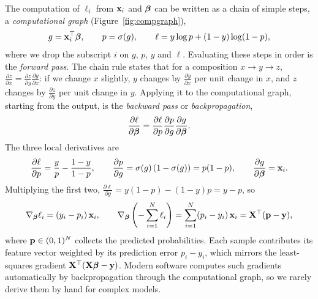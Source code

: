 The computation of $\ell_i$ from $\mathbf{x}_i$ and $\boldsymbol{\beta}$ can be written as a chain of simple steps, a \emph{computational graph} (Figure~\ref{fig:compgraph}),
\begin{equation}
  g = \mathbf{x}_i^\top\boldsymbol{\beta}, \qquad p = \sigma(g), \qquad \ell = y\log p+(1-y)\log(1-p),
\end{equation}
where we drop the subscript $i$ on $g$, $p$, $y$ and $\ell$. Evaluating these steps in order is the \emph{forward pass}. The chain rule states that for a composition $x\to y\to z$, $\frac{\partial z}{\partial x}=\frac{\partial z}{\partial y}\frac{\partial y}{\partial x}$: if we change $x$ slightly, $y$ changes by $\frac{\partial y}{\partial x}$ per unit change in $x$, and $z$ changes by $\frac{\partial z}{\partial y}$ per unit change in $y$. Applying it to the computational graph, starting from the output, is the \emph{backward pass} or \emph{backpropagation},
\begin{equation}
  \frac{\partial\ell}{\partial\boldsymbol{\beta}} = \frac{\partial\ell}{\partial p}\frac{\partial p}{\partial g}\frac{\partial g}{\partial\boldsymbol{\beta}}.
\end{equation}
The three local derivatives are
\begin{equation}
  \frac{\partial\ell}{\partial p} = \frac{y}{p}-\frac{1-y}{1-p}, \qquad \frac{\partial p}{\partial g} = \sigma(g)\left(1-\sigma(g)\right) = p(1-p), \qquad \frac{\partial g}{\partial\boldsymbol{\beta}} = \mathbf{x}_i .
\end{equation}
Multiplying the first two, $\frac{\partial\ell}{\partial g} = y(1-p)-(1-y)p = y-p$, so
\begin{equation}
  \nabla_{\boldsymbol{\beta}}\ell_i = (y_i-p_i)\,\mathbf{x}_i, \qquad \nabla_{\boldsymbol{\beta}}\left(-\sum_{i=1}^N\ell_i\right) = \sum_{i=1}^N(p_i-y_i)\,\mathbf{x}_i = \mathbf{X}^\top(\mathbf{p}-\mathbf{y}),
  \label{eq:logistic_grad}
\end{equation}
where $\mathbf{p}\in(0,1)^N$ collects the predicted probabilities. Each sample contributes its feature vector weighted by its prediction error $p_i-y_i$, which mirrors the least-squares gradient $\mathbf{X}^\top(\mathbf{X}\boldsymbol{\beta}-\mathbf{y})$. Modern software computes such gradients automatically by backpropagation through the computational graph, so we rarely derive them by hand for complex models.

